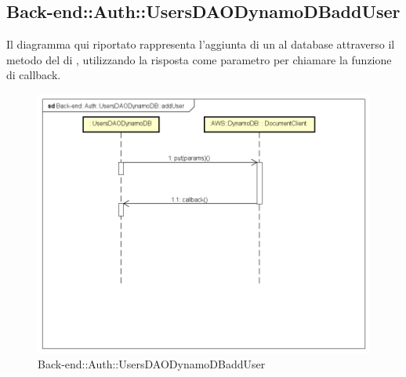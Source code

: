 \subsection{Back-end::Auth::UsersDAODynamoDBaddUser}
Il diagramma qui riportato rappresenta l'aggiunta di un  al database attraverso il metodo  del  di , utilizzando la risposta come parametro per chiamare la funzione di callback.
\begin{figure}[h] \centering \includegraphics[width=\textwidth,height=\textheight,keepaspectratio]{images/diagrams/back-end/Ufficial_Backend/Back-endAuthUsersDAODynamoDBaddUser.png} 	\caption{Back-end::Auth::UsersDAODynamoDBaddUser}
\end{figure} 
\newpage
